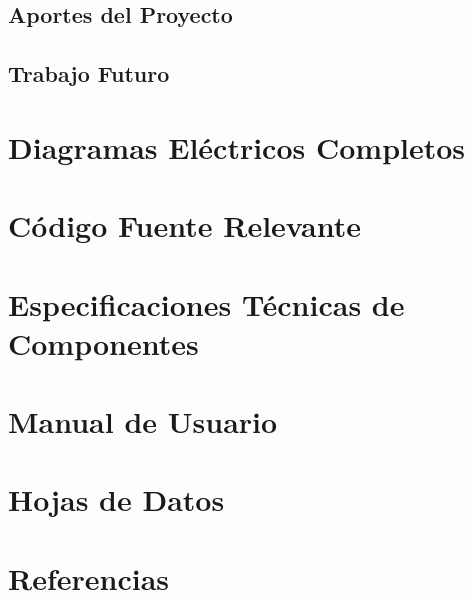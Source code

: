 \documentclass[a4paper,12pt]{report}
\begin{document}
\section{Aportes del Proyecto}



\section{Trabajo Futuro}




\appendix
\chapter{Diagramas Eléctricos Completos}


\chapter{Código Fuente Relevante}


\chapter{Especificaciones Técnicas de Componentes}


\chapter{Manual de Usuario}


\chapter{Hojas de Datos}


\chapter*{Referencias}

\end{document}
